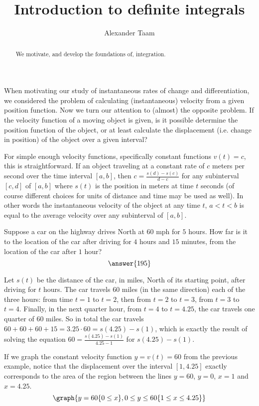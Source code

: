 \documentclass{ximera}
\title{Introduction to definite integrals}
\author{Alexander Taam}
\begin{document}
\begin{abstract}
  We motivate, and develop the foundations of, integration.
\end{abstract}
\maketitle

When motivating our study of instantaneous rates of change and differentiation, we considered the problem of calculating (instantaneous) velocity from a given position function. Now we turn our attention to (almost) the opposite problem. If the velocity function of a moving object is given, is it possible determine the position function of the object, or at least calculate the displacement (i.e. change in position) of the object over a given interval?

For simple enough velocity functions, specifically constant functions $v(t)=c$, this is straightforward. If an object traveling at a constant rate of $c$ meters per second over the time interval $[a,b]$, then $c=\frac{s(d)-s(c)}{d-c}$ for any subinterval $[c,d]$ of $[a,b]$ where $s(t)$ is the position in meters at time $t$ seconds (of course different choices for units of distance and time may be used as well). In other words the instantaneous velocity of the object at any time $t$, $a<t<b$ is equal to the average velocity over any subinterval of $[a,b]$.

\begin{example}
Suppose a car on the highway drives North at $60$ mph for $5$ hours. How far is it to the location of the car after driving for $4$ hours and $15$ minutes, from the location of the car after $1$ hour? \[\answer{195}\]

\begin{feedback} Let $s(t)$ be the distance of the car, in miles, North of its starting point, after driving for $t$ hours. The car travels $60$ miles (in the same direction) each of the three hours: from time $t=1$ to $t=2$, then from $t=2$ to $t=3$, from $t=3$ to $t=4$. Finally, in the next quarter hour, from $t=4$ to $t=4.25$, the car travels one quarter of $60$ miles. So in total the car travels $60+60+60+15=3.25\cdot60=s(4.25)-s(1)$, which is exactly the result of solving the equation $60=\frac{s(4.25)-s(1)}{4.25-1}$ for $s(4.25)-s(1)$.
\end{feedback}
\end{example}

If we graph the constant velocity function $y=v(t)=60$ from the previous example, notice that the displacement over the interval $[1,4.25]$ exactly corresponds to the area of the region between the lines $y=60$, $y=0$, $x=1$ and $x=4.25$.
\[
\graph{y=60\{0\leq x\},0\leq y\leq 60\{1\leq x\leq 4.25\}}
\]
\end{document}
